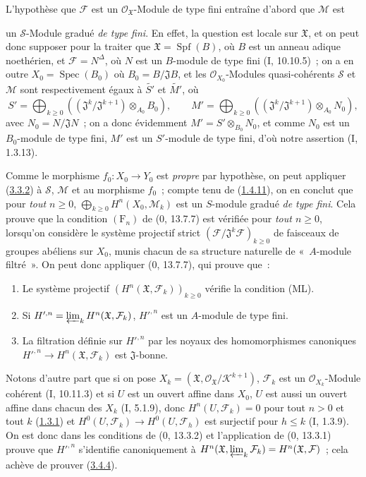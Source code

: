 L'hypothèse que $\mathcal F$ est un $\mathcal O_{\mathfrak X}$-Module de type
fini entraîne d'abord que $\mathcal M$ est

un $\mathcal S$-Module gradué \emph{de type fini}. En effet, la question est
locale sur $\mathfrak X$, et on peut donc supposer pour la traiter que
$\mathfrak X=\operatorname{Spf}(B)$, où $B$ est un anneau adique noethérien,
et $\mathcal F=N^\Delta$, où $N$ est un $B$-module de type fini
(I, 10.10.5)~; on a en outre $X_0=\operatorname{Spec}(B_0)$ où
$B_0=B/\mathfrak J B$, et les $\mathcal O_{X_0}$-Modules quasi-cohérents
$\mathcal S$ et $\mathcal M$ sont respectivement égaux à $\widetilde{S'}$ et
$\widetilde{M'}$, où
\[
S'=\bigoplus_{k\geq0}
((\mathfrak J^k/\mathfrak J^{k+1})\otimes_{A_0}B_0),\qquad
M'=\bigoplus_{k\geq0}
((\mathfrak J^k/\mathfrak J^{k+1})\otimes_{A_0}N_0),
\]
avec $N_0=N/\mathfrak JN$~; on a donc évidemment
$M'=S'\otimes_{B_0}N_0$, et comme $N_0$ est un $B_0$-module de type fini,
$M'$ est un $S'$-module de type fini, d'où notre assertion (I, 1.3.13).

Comme le morphisme $f_0:X_0\to Y_0$ est \emph{propre} par hypothèse, on peut
appliquer (\hyperref[III.3.3.2-fr]{3.3.2}) à $\mathcal S$, $\mathcal M$ et au
morphisme $f_0$~; compte tenu de (\hyperref[III.1.4.11-fr]{1.4.11}), on en
conclut que pour \emph{tout $n\geq0$},
$\bigoplus_{k\geq0}H^n(X_0,\mathcal M_k)$ est un $S$-module gradué \emph{de
type fini}. Cela prouve que la condition $(\mathrm F_n)$ de (0, 13.7.7) est
vérifiée pour \emph{tout $n\geq0$}, lorsqu'on considère le système projectif
strict $(\mathcal F/\mathfrak J^k\mathcal F)_{k\geq0}$ de faisceaux de
groupes abéliens sur $X_0$, munis chacun de sa structure naturelle de
«~$A$-module filtré~». On peut donc appliquer (0, 13.7.7), qui prouve que~:
\begin{enumerate}
\item[$1^\circ$] Le système projectif
$(H^n(\mathfrak X,\mathcal F_k))_{k\geq0}$ vérifie la condition (ML).
\item[$2^\circ$] Si
$H'^{,n}=\varprojlim_kH^n(\mathfrak X,\mathcal F_k)$, $H'^{,n}$ est un
$A$-module de type fini.
\item[$3^\circ$] La filtration définie sur $H'^{,n}$ par les noyaux des
homomorphismes canoniques $H'^{,n}\to H^n(\mathfrak X,\mathcal F_k)$ est
$\mathfrak J$-bonne.
\end{enumerate}

Notons d'autre part que si on pose
$X_k=(\mathfrak X,\mathcal O_{\mathfrak X}/\mathcal K^{k+1})$,
$\mathcal F_k$ est un $\mathcal O_{X_k}$-Module cohérent (I, 10.11.3) et si
$U$ est un ouvert affine dans $X_0$, $U$ est aussi un ouvert affine dans
chacun des $X_k$ (I, 5.1.9), donc $H^n(U,\mathcal F_k)=0$ pour tout $n>0$ et
tout $k$ (\hyperref[III.1.3.1-fr]{1.3.1}) et
$H^0(U,\mathcal F_k)\to H^0(U,\mathcal F_h)$ est surjectif pour $h\leq k$
(I, 1.3.9). On est donc dans les conditions de (0, 13.3.2) et l'application
de (0, 13.3.1) prouve que $H'^{,n}$ s'identifie canoniquement à
$H^n(\mathfrak X,\varprojlim_k\mathcal F_k)=H^n(\mathfrak X,\mathcal F)$~;
cela achève de prouver (\hyperref[III.3.4.4-fr]{3.4.4}).

